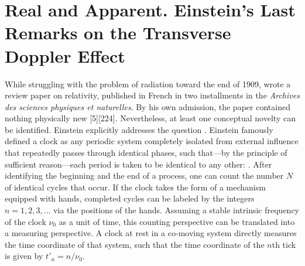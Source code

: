 \documentclass[submitted,12pt]{article}
\newcommand{\TDE}{Transverse Doppler Effect\xspace}
\begin{document}
\section*{Real and Apparent. Einstein’s Last Remarks on the \TDE}
%
While struggling with the problem of radiation toward the end of 1909, \citet{Einstein1910} wrote a review paper on relativity, published in French in two installments in the \textit{Archives des sciences physiques et naturelles}. By his own admission, the paper contained nothing physically new [5][224]. Nevertheless, at least one conceptual novelty can be identified. Einstein explicitly addresses the question  \citep[21]{Einstein1910}. Einstein famously defined a clock as any periodic system completely isolated from external influence that repeatedly passes through identical phases, such that—by the principle of sufficient reason—each period is taken to be identical to any other:  \citep[21]{Einstein1910}. After identifying the beginning and the end of a process, one can count the number $N$ of identical cycles that occur. If the clock takes the form of a mechanism equipped with hands, completed cycles can be labeled by the integers $n=1,2,3,\ldots$ via the positions of the hands. Assuming a stable intrinsic frequency of the clock $\nu_0$ as a unit of time, this counting perspective can be translated into a measuring perspective. A clock at rest in a co-moving system directly measures the time coordinate of that system, such that the time coordinate of the $n$th tick is given by $t'_n = n/\nu_0$.
\end{document}
